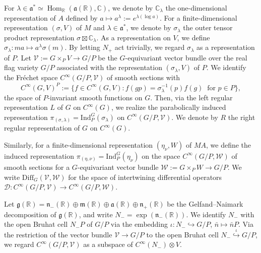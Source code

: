 \documentclass[reqno,11pt]{amsart}
\theoremstyle{remark}
\numberwithin{equation}{section}
\newcommand{\fa}{{\mathfrak a}}
\newcommand{\fn}{{\mathfrak n}}
\newcommand{\R}{\mathbb{R}}
\newcommand{\C}{\mathbb{C}}
\newcommand{\Cal}{\mathcal}
\newcommand{\Hom}{\operatorname{Hom}}
\newcommand{\Ind}{\mathrm{Ind}}
\newcommand{\Diff}{\mathrm{Diff}}
\newcommand{\D}{\Cal{D}}
\begin{document}
For $\lambda \in \fa^* \simeq \Hom_\R(\fa(\R),\C)$,
we denote by $\C_\lambda$ 
the one-dimensional representation of $A$ defined by 
$a\mapsto a^\lambda:=e^{\lambda(\log a)}$. 
For a finite-dimensional 
representation $(\sigma, V)$ of $M$ and $\lambda \in \fa^*$,
we denote by $\sigma_\lambda$ the outer tensor product representation $\sigma \boxtimes \C_\lambda$. As a representation on $V$, we define $\sigma_\lambda \colon
ma \mapsto a^\lambda\sigma(m)$. By letting $N_+$ act trivially, we regard 
$\sigma_\lambda$ as a representation of $P$. Let $\Cal{V}:=G \times_P V \to G/P$
be the $G$-equivariant vector bundle over the real flag variety $G/P$
 associated with the 
representation $(\sigma_\lambda, V)$ of $P$. We identify the Fr{\' e}chet space 
$C^\infty(G/P, \Cal{V})$ of smooth sections with 
\begin{equation*}
C^\infty(G, V)^P:=\{f \in C^\infty(G,V) : 
f(gp) = \sigma_\lambda^{-1}(p)f(g)
\;\;
\text{for $p \in P$}\},
\end{equation*}
the space of $P$-invariant smooth functions on $G$.
Then, via the left regular representation $L$ of $G$ on $C^\infty(G)$,
we realize the parabolically induced representation 
$\pi_{(\sigma, \lambda)} = \Ind_{P}^G(\sigma_\lambda)$ on $C^\infty(G/P, \Cal{V})$.
We denote by $R$ the right regular representation of $G$ on $C^\infty(G)$.

Similarly, for a finite-dimensional 
representation $(\eta_\nu, W)$ of $MA$, we define
the induced representation $\pi_{(\eta, \nu)}=\Ind_P^G(\eta_\nu)$ on the 
space $C^\infty(G/P, \Cal{W})$ of smooth sections for a $G$-equivariant vector bundle 
$\Cal{W}:=G\times_PW \to G/P$.
We write $\Diff_G(\Cal{V},\Cal{W})$ for the space of intertwining differential operators
$\D \colon C^\infty(G/P, \Cal{V}) \to C^\infty(G/P, \Cal{W})$.

Let $\mathfrak{g}(\R)=\mathfrak{n}_-(\R) \oplus \mathfrak{m}(\R) 
\oplus \mathfrak{a}(\R) \oplus \mathfrak{n}_+(\R)$ be the 
Gelfand--Naimark decomposition of $\mathfrak{g}(\R)$,
and write $N_- = \exp(\fn_-(\R))$. We identify $N_-$ with the 
open Bruhat cell $N_-P$ of $G/P$ via the embedding 
$\iota\colon N_- \hookrightarrow G/P$, $\bar{n} \mapsto \bar{n}P$.
Via the restriction of the vector bundle $\Cal{V} \to G/P$ to the open Bruhat cell
$N_-\stackrel{\iota}{\hookrightarrow} G/P$,
we regard $C^\infty(G/P,\mathcal{V})$ as a subspace of 
$C^\infty(N_-) \otimes V$.
\end{document}
